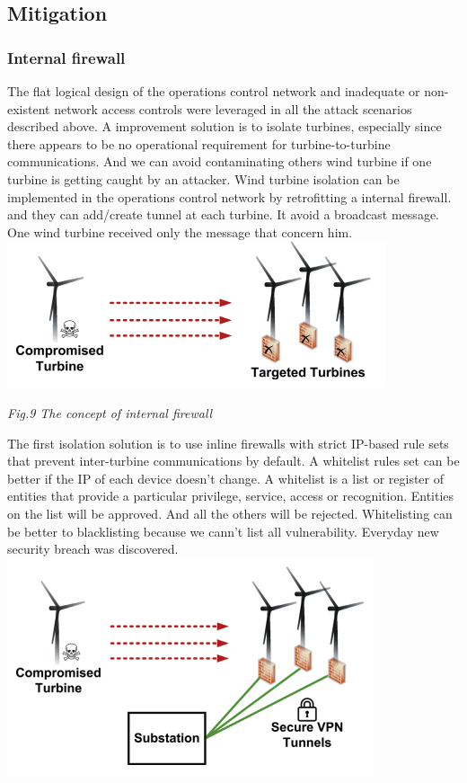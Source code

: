 \documentclass[twosided,a4,10pt]{article}
\begin{document}
\begin{multicols}{2}
	
\subsection{Mitigation}

\subsubsection{Internal firewall}
The flat logical design of the operations control network and inadequate or non-existent network access controls were leveraged in all the attack scenarios described above. A improvement solution is to isolate turbines, especially since there appears to be no operational requirement for turbine-to-turbine communications. And we can avoid contaminating  others wind turbine if one turbine is getting caught by an attacker. Wind turbine isolation can be implemented in the operations control network by retrofitting a internal firewall. and they can add/create tunnel at each turbine. It avoid a broadcast message. One wind turbine received only the message that concern him. 
\includegraphics[scale=0.8]{internalfirewall}
\begin{center}
	\textit{Fig.9 The concept of internal firewall}
\end{center}
The first isolation solution is to use inline firewalls with strict IP-based rule sets that prevent inter-turbine communications by default. A whitelist rules set can be better if the IP of each device doesn't change. A whitelist is a list or register of entities that provide a particular privilege, service, access or recognition. Entities on the list will be approved. And all the others will be rejected. Whitelisting can be better to blacklisting because we cann't list all vulnerability. Everyday new security breach was discovered.
\includegraphics[scale=0.85]{vpn}

\end{multicols}
\end{document}
